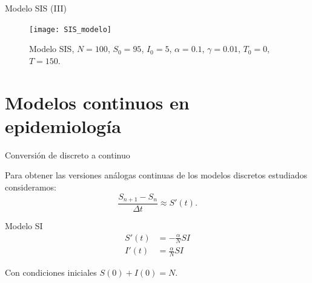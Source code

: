 \begin{frame}{Modelo SIS (III)}


    \begin{figure}
        \begin{center}
        \caption{Modelo SIS, $N=100$, $S_0=95$, $I_0 = 5$, $\alpha = 0.1$, $\gamma=0.01$, $T_0 = 0$, $T = 150$.}
        \texttt{[image: SIS\_modelo]}
        \end{center}
    \end{figure}

\end{frame}




\section{Modelos continuos en epidemiología}


\begin{frame}{Conversión de discreto a continuo}

    Para obtener las versiones análogas continuas de los modelos discretos estudiados consideramos:    
    $$\frac{S_{n+1} - S_n}{\Delta t} \approx S'(t).$$
    
    \pause
    \begin{block}{Modelo SI}
        \begin{equation}
            \label{eqn:SI_continuo}
            \begin{aligned}
            S'(t) & = -\frac{\alpha}{N}SI \\
            I'(t) & = \frac{\alpha}{N}SI
            \end{aligned}
        \end{equation}
            
        Con condiciones iniciales $S(0)+I(0)=N$.
    \end{block}
\end{frame}


